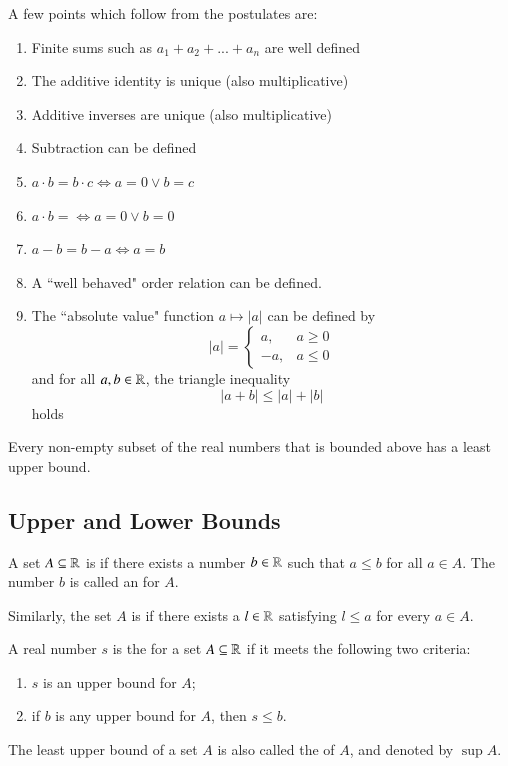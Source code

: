 \documentclass[12pt, a4paper, oneside, openright, titlepage]{book}
\begin{document}
\begin{rmk}
    A few points which follow from the postulates are:\begin{enumerate}
        \item Finite sums such as $a_1+a_2+...+a_n$ are well defined
        \item The additive identity is unique (also multiplicative)
        \item Additive inverses are unique (also multiplicative)
        \item Subtraction can be defined 
        \item $a \cdot b = b \cdot c \iff a = 0\lor b = c$
        \item $a\cdot b = \iff a = 0 \lor b = 0$
        \item $a-b = b-a \iff a = b$
        \item A ``well behaved" order relation can be defined.
        \item The ``absolute value" function $a \mapsto |a|$ can be defined by $$|a| = \left\{\begin{array}{ll} a, & a \geq 0 \\ -a, & a \leq 0 \end{array}\right.$$ and for all $a,b \in \mathbb R$, the triangle inequality $$|a+b| \leq |a| + |b|$$ holds
    \end{enumerate}
\end{rmk}


\begin{axi}
    Every non-empty subset of the real numbers that is bounded above has a least upper bound.
\end{axi}

\subsection{Upper and Lower Bounds}

\begin{defn}[Bounds]
    A set $A \subseteq \mathbb R$ is  if there exists a number $b \in \mathbb R$ such that $a \leq b$ for all $a \in A$. The number $b$ is called an  for $A$.


    Similarly, the set $A$ is  if there exists a  $l \in \mathbb R$ satisfying $l \leq a$ for every $a \in A$.
\end{defn}

\begin{defn}
    A real number $s$ is the  for a set $A \subseteq \mathbb R$ if it meets the following two criteria: \begin{enumerate}
        \item $s$ is an upper bound for $A$;
        \item if $b$ is any upper bound for $A$, then $s \leq b$.
    \end{enumerate}
    The least upper bound of a set $A$ is also called the  of $A$, and denoted by $\sup A$.
\end{defn}
\end{document}
